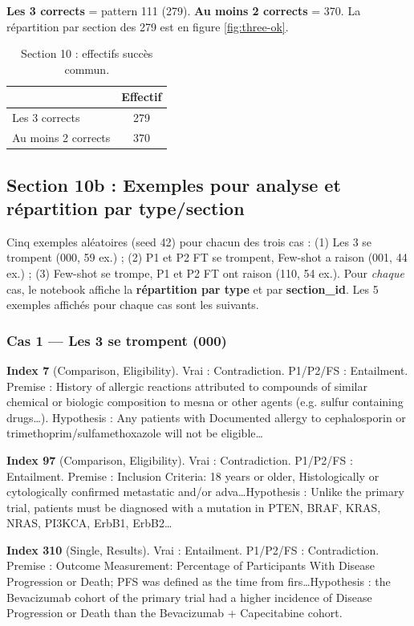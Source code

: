 \documentclass[11pt,a4paper]{article}
\begin{document}
\textbf{Les 3 corrects} = pattern 111 (279). \textbf{Au moins 2 corrects} = 370. La répartition par section des 279 est en figure \ref{fig:three-ok}.

\begin{table}[H]
  \centering
  \caption{Section 10 : effectifs succès commun.}
  \label{tab:three}
  \begin{tabular}{lc}
    \toprule
    & Effectif \\
    \midrule
    Les 3 corrects & 279 \\
    Au moins 2 corrects & 370 \\
    \bottomrule
  \end{tabular}
\end{table}

\subsection{Section 10b : Exemples pour analyse et répartition par type/section}

Cinq exemples aléatoires (seed 42) pour chacun des trois cas : (1) Les 3 se trompent (000, 59 ex.) ; (2) P1 et P2 FT se trompent, Few-shot a raison (001, 44 ex.) ; (3) Few-shot se trompe, P1 et P2 FT ont raison (110, 54 ex.). Pour \emph{chaque} cas, le notebook affiche la \textbf{répartition par type} et par \textbf{section\_id}. Les 5 exemples affichés pour chaque cas sont les suivants.

\subsubsection*{Cas 1 — Les 3 se trompent (000)}
\textbf{Index 7} (Comparison, Eligibility). Vrai : Contradiction. P1/P2/FS : Entailment. Premise : History of allergic reactions attributed to compounds of similar chemical or biologic composition to mesna or other agents (e.g. sulfur containing drugs\ldots). Hypothesis : Any patients with Documented allergy to cephalosporin or trimethoprim/sulfamethoxazole will not be eligible\ldots

\textbf{Index 97} (Comparison, Eligibility). Vrai : Contradiction. P1/P2/FS : Entailment. Premise : Inclusion Criteria: 18 years or older, Histologically or cytologically confirmed metastatic and/or adva\ldots Hypothesis : Unlike the primary trial, patients must be diagnosed with a mutation in PTEN, BRAF, KRAS, NRAS, PI3KCA, ErbB1, ErbB2\ldots

\textbf{Index 310} (Single, Results). Vrai : Entailment. P1/P2/FS : Contradiction. Premise : Outcome Measurement: Percentage of Participants With Disease Progression or Death; PFS was defined as the time from firs\ldots Hypothesis : the Bevacizumab cohort of the primary trial had a higher incidence of Disease Progression or Death than the Bevacizumab + Capecitabine cohort.
\end{document}
